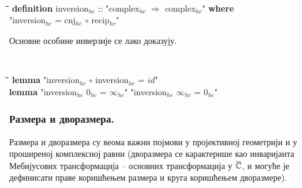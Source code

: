 {\tt
\begin{tabbing}
\hspace{5mm}\=\hspace{5mm}\=\hspace{5mm}\=\hspace{5mm}\=\hspace{5mm}\=\kill
\textbf{definition} inversion$_{hc}$ :: "complex$_{hc}$ $\Rightarrow$ complex$_{hc}$" \textbf{where}\\
\> "inversion$_{hc}$ = cnj$_{hc}$ $\circ$ recip$_{hc}$"
\end{tabbing}
}

Основне особине инверзије се лако доказују.
{\tt
\begin{tabbing}
\hspace{5mm}\=\hspace{5mm}\=\hspace{5mm}\=\hspace{5mm}\=\hspace{5mm}\=\kill
\textbf{lemma} "inversion$_{hc}$ $\circ$ inversion$_{hc}$ = $id$"\\
\textbf{lemma} "inversion$_{hc}$ $0_{hc}$ = $\infty_{hc}$" "inversion$_{hc}$ $\infty_{hc}$ = $0_{hc}$"
\end{tabbing}
}

\subsubsection{Размера и дворазмера.}

Размера и дворазмера су веома важни појмови у пројективној геометрији
и у проширеној комплексној равни (дворазмера се карактерише као
инваријанта Мебијусових трансформација -- основних трансформација у
$\overline{\mathbb{C}}$, и могуће је дефинисати праве коришћењем размера и круга
коришћењем дворазмере).

